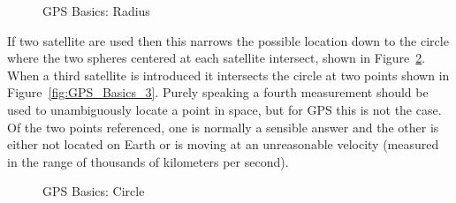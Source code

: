 \begin{figure}
  \centering
  \caption{GPS Basics: Radius}
	\label{fig:GPS_Basics_1}
\end{figure}

If two satellite are used then this narrows the possible location down to the circle where the two spheres centered at each satellite intersect, shown in Figure~\ref{fig:GPS_Basics_2}. When a third satellite is introduced it intersects the circle at two points shown in Figure~\ref{fig:GPS_Basics_3}. Purely speaking a fourth measurement should be used to unambiguously locate a point in space, but for GPS this is not the case.  Of the two points referenced, one is normally a sensible answer and the other is either not located on Earth or is moving at an unreasonable velocity (measured in the range of thousands of kilometers per second).

\begin{figure}
	\centering
	\caption{GPS Basics: Circle}
	\label{fig:GPS_Basics_2}
\end{figure}


